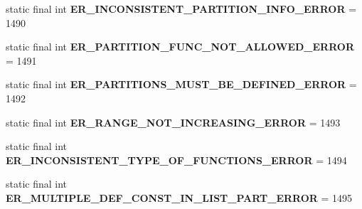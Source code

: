 \begin{DoxyCompactItemize}
\item 
\mbox{\label{classcom_1_1mysql_1_1cj_1_1exceptions_1_1_mysql_error_numbers_a2a12b645116fd1496c0c72d6fd668fb0}} 
static final int {\bfseries E\+R\+\_\+\+I\+N\+C\+O\+N\+S\+I\+S\+T\+E\+N\+T\+\_\+\+P\+A\+R\+T\+I\+T\+I\+O\+N\+\_\+\+I\+N\+F\+O\+\_\+\+E\+R\+R\+OR} = 1490
\item 
\mbox{\label{classcom_1_1mysql_1_1cj_1_1exceptions_1_1_mysql_error_numbers_ab3e1b777aff4309acc1ae5485a0a9c49}} 
static final int {\bfseries E\+R\+\_\+\+P\+A\+R\+T\+I\+T\+I\+O\+N\+\_\+\+F\+U\+N\+C\+\_\+\+N\+O\+T\+\_\+\+A\+L\+L\+O\+W\+E\+D\+\_\+\+E\+R\+R\+OR} = 1491
\item 
\mbox{\label{classcom_1_1mysql_1_1cj_1_1exceptions_1_1_mysql_error_numbers_a6ae7c9f4860e65cae0a107b0c36044d7}} 
static final int {\bfseries E\+R\+\_\+\+P\+A\+R\+T\+I\+T\+I\+O\+N\+S\+\_\+\+M\+U\+S\+T\+\_\+\+B\+E\+\_\+\+D\+E\+F\+I\+N\+E\+D\+\_\+\+E\+R\+R\+OR} = 1492
\item 
\mbox{\label{classcom_1_1mysql_1_1cj_1_1exceptions_1_1_mysql_error_numbers_a6f0926e59169522d08bb08c92513d59c}} 
static final int {\bfseries E\+R\+\_\+\+R\+A\+N\+G\+E\+\_\+\+N\+O\+T\+\_\+\+I\+N\+C\+R\+E\+A\+S\+I\+N\+G\+\_\+\+E\+R\+R\+OR} = 1493
\item 
\mbox{\label{classcom_1_1mysql_1_1cj_1_1exceptions_1_1_mysql_error_numbers_a09c04924a7fa4ca9c429b4fbd1ef81ce}} 
static final int {\bfseries E\+R\+\_\+\+I\+N\+C\+O\+N\+S\+I\+S\+T\+E\+N\+T\+\_\+\+T\+Y\+P\+E\+\_\+\+O\+F\+\_\+\+F\+U\+N\+C\+T\+I\+O\+N\+S\+\_\+\+E\+R\+R\+OR} = 1494
\item 
\mbox{\label{classcom_1_1mysql_1_1cj_1_1exceptions_1_1_mysql_error_numbers_ad877708eca33a05effed44b3bce37083}} 
static final int {\bfseries E\+R\+\_\+\+M\+U\+L\+T\+I\+P\+L\+E\+\_\+\+D\+E\+F\+\_\+\+C\+O\+N\+S\+T\+\_\+\+I\+N\+\_\+\+L\+I\+S\+T\+\_\+\+P\+A\+R\+T\+\_\+\+E\+R\+R\+OR} = 1495
\item 
\mbox{\label{classcom_1_1mysql_1_1cj_1_1exceptions_1_1_mysql_error_numbers_a9f06ab89ce988d938e6d1bc200052fa8}} 

\end{DoxyCompactItemize}
